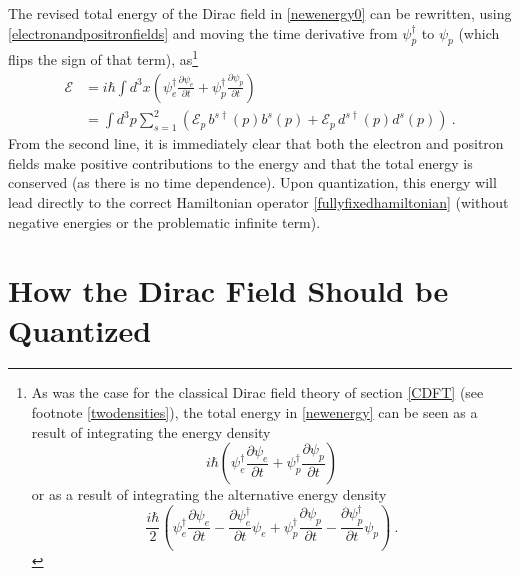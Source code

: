 \documentclass[12pt,secnumarabic,amsmath,amssymb,balancelastpage,nofootinbib]{article}
\begin{document}
The revised total energy of the Dirac field in \eqref{newenergy0} can be rewritten, using \eqref{electronandpositronfields} and moving the time derivative from $\psi_p^{\dagger}$ to $\psi_p$ (which flips the sign of that term), as\footnote{As was the case for the classical Dirac field theory of section \ref{CDFT} (see footnote \ref{twodensities}), the total energy in \eqref{newenergy} can be seen as a result of integrating the energy density
\begin{equation}
i \hbar \left( \psi_e^{\dagger}\frac{\partial \psi_e}{\partial t} + \psi_p^{\dagger}\frac{\partial \psi_p}{\partial t}\right)
\end{equation}
or as a result of integrating the alternative energy density
\begin{equation}
\frac{i \hbar}{2} \left( \psi_e^{\dagger}\frac{\partial \psi_e}{\partial t} -\frac{\partial\psi_e^{\dagger} }{\partial t}\psi_e+ \psi_p^{\dagger}\frac{\partial \psi_p}{\partial t}-\frac{\partial \psi_p^{\dagger}}{\partial t} \psi_p\right)
\ .
\end{equation}
\label{newdensities}
}
\begin{align}
\mathcal{E}&=i \hbar \int{d^3 x \left( \psi_e^{\dagger}\frac{\partial \psi_e}{\partial t} + \psi_p^{\dagger}\frac{\partial \psi_p}{\partial t}\right)}
\nonumber
\\
&=\int{d^3 p \sum_{s=1}^2  \left(\mathcal{E}_p\,b^{s\dagger}(p)b^{s}(p)+\mathcal{E}_p\,d^{s\dagger}(p)d^{s}(p)\right)}
\ .
\label{newenergy}
\end{align}
From the second line, it is immediately clear that both the electron and positron fields make positive contributions to the energy and that the total energy is conserved (as there is no time dependence).  Upon quantization, this energy will lead directly to the correct Hamiltonian operator \eqref{fullyfixedhamiltonian} (without negative energies or the problematic infinite term).







\section{How the Dirac Field Should be Quantized}\label{howtoquantize}
\end{document}
